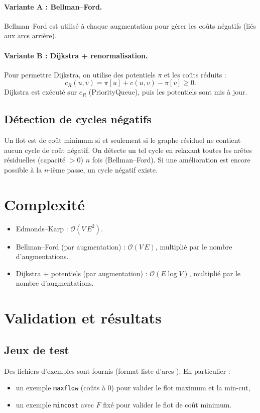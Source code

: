\documentclass{rapport}
\begin{document}
\paragraph{Variante A : Bellman--Ford.}
Bellman--Ford est utilisé à chaque augmentation pour gérer les coûts négatifs (liés aux arcs arrière).

\paragraph{Variante B : Dijkstra + renormalisation.}
Pour permettre Dijkstra, on utilise des potentiels $\pi$ et les coûts réduits :
\[
    c_R(u,v) = \pi[u] + c(u,v) - \pi[v] \ge 0.
\]
Dijkstra est exécuté sur $c_R$ (PriorityQueue), puis les potentiels sont mis à jour.

\subsection{Détection de cycles négatifs}
Un flot est de coût minimum si et seulement si le graphe résiduel ne contient aucun cycle de coût négatif. On détecte un tel cycle en relaxant toutes les arêtes résiduelles (capacité $>0$) $n$ fois (Bellman--Ford). Si une amélioration est encore possible à la $n$-ième passe, un cycle négatif existe.

\section{Complexité}\label{sec:complex}
\begin{itemize}
    \item Edmonds--Karp : $\mathcal{O}(V\,E^2)$.
    \item Bellman--Ford (par augmentation) : $\mathcal{O}(V\,E)$, multiplié par le nombre d'augmentations.
    \item Dijkstra + potentiels (par augmentation) : $\mathcal{O}(E\log V)$, multiplié par le nombre d'augmentations.
\end{itemize}

\section{Validation et résultats}\label{sec:validation}
\subsection{Jeux de test}
Des fichiers d'exemples sont fournis (format \og liste d'arcs \fg{}). En particulier :
\begin{itemize}
    \item un exemple \texttt{maxflow} (coûts à 0) pour valider le flot maximum et la min-cut,
    \item un exemple \texttt{mincost} avec $F$ fixé pour valider le flot de coût minimum.
\end{itemize}
\end{document}
